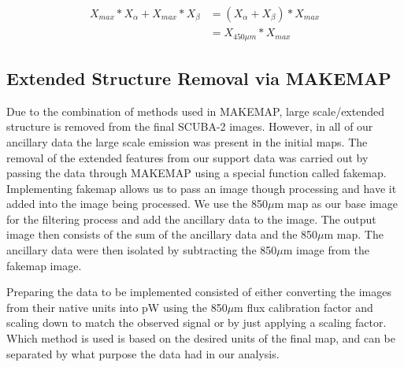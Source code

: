 \begin{equation} \label{eq_GBSmethod}
  \begin{split}
    X_{max} \ast X_{\alpha} + X_{max} \ast X_{\beta} & = \left(X_{\alpha} + X_{\beta}\right) \ast X_{max} \\
     & = X_{450\mu m} \ast X_{max}
   \end{split}
\end{equation}

\subsection{Extended Structure Removal via MAKEMAP}\label{fakesource_sec}


Due to the combination of methods used in MAKEMAP, large scale/extended structure is removed from the final SCUBA-2 images.  However, in all of our ancillary data the large scale emission was present in the initial maps.  The removal of the extended features from our support data was carried out by passing the data through MAKEMAP using a special function called fakemap.  Implementing fakemap allows us to pass an image though processing and have it added into the image being processed.  We use the 850$\mu$m map as our base image for the filtering process and add the ancillary data to the image.  The output image then consists of the sum of the ancillary data and the 850$\mu$m map.  The ancillary data were then isolated by subtracting the 850$\mu$m image from the fakemap image.  

Preparing the data to be implemented consisted of either converting the images from their native units into pW using the 850$\mu$m flux calibration factor and scaling down to match the observed signal or by just applying a scaling factor.  Which method is used is based on the desired units of the final map, and can be separated by what purpose the data had in our analysis.

